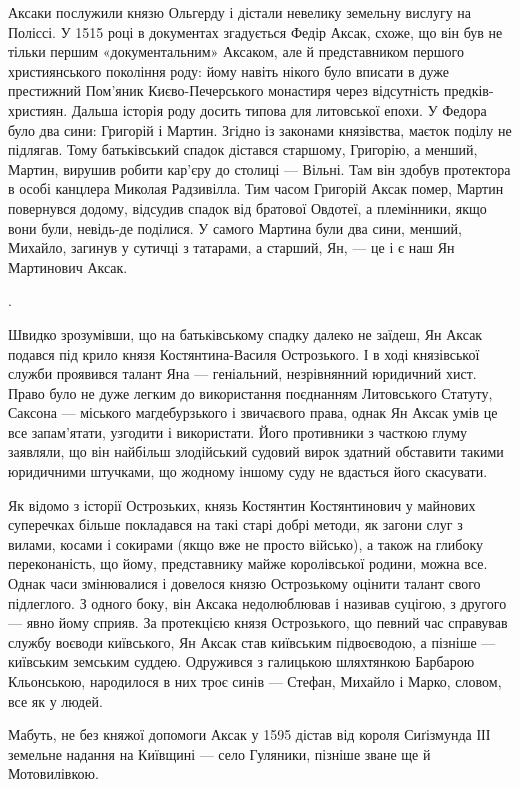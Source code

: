Аксаки послужили князю Ольгерду і дістали невелику земельну вислугу на Поліссі.
У 1515 році в документах згадується Федір Аксак, схоже, що він був не тільки
першим «документальним» Аксаком, але й представником першого християнського
покоління роду: йому навіть нікого було вписати в дуже престижний Пом’яник
Києво-Печерського монастиря через відсутність предків-християн. Дальша історія
роду досить типова для литовської епохи. У Федора було два сини: Григорій і
Мартин. Згідно із законами князівства, маєток поділу не підлягав. Тому
батьківський спадок дістався старшому, Григорію, а менший, Мартин, вирушив
робити кар’єру до столиці — Вільні. Там він здобув протектора в особі канцлера
Миколая Радзивілла. Тим часом Григорій Аксак помер, Мартин повернувся додому,
відсудив спадок від братової Овдотеї, а племінники, якщо вони були, невідь-де
поділися. У самого Мартина були два сини, менший, Михайло, загинув у сутичці з
татарами, а старший, Ян, — це і є наш Ян Мартинович Аксак.

.

Швидко зрозумівши, що на батьківському спадку далеко не заїдеш, Ян Аксак
подався під крило князя Костянтина-Василя Острозького. І в ході князівської
служби проявився талант Яна — геніальний, незрівнянний юридичний хист. Право
було не дуже легким до використання поєднанням Литовського Статуту, Саксона —
міського магдебурзького і звичаєвого права, однак Ян Аксак умів це все
запам’ятати, узгодити і використати. Його противники з часткою глуму заявляли,
що він найбільш злодійський судовий вирок здатний обставити такими юридичними
штучками, що жодному іншому суду не вдасться його скасувати.

Як відомо з історії Острозьких, князь Костянтин Костянтинович у майнових
суперечках більше покладався на такі старі добрі методи, як загони слуг з
вилами, косами і сокирами (якщо вже не просто військо), а також на глибоку
переконаність, що йому, представнику майже королівської родини, можна все.
Однак часи змінювалися і довелося князю Острозькому оцінити талант свого
підлеглого. З одного боку, він Аксака недолюблював і називав суцігою, з другого
— явно йому сприяв. За протекцією князя Острозького, що певний час справував
службу воєводи київського, Ян Аксак став київським підвоєводою, а пізніше —
київським земським суддею. Одружився з галицькою шляхтянкою Барбарою
Кльонською, народилося в них троє синів — Стефан, Михайло і Марко, словом, все
як у людей.

Мабуть, не без княжої допомоги Аксак у 1595 дістав від короля Сиґізмунда ІІІ
земельне надання на Київщині — село Гуляники, пізніше зване ще й Мотовилівкою.

